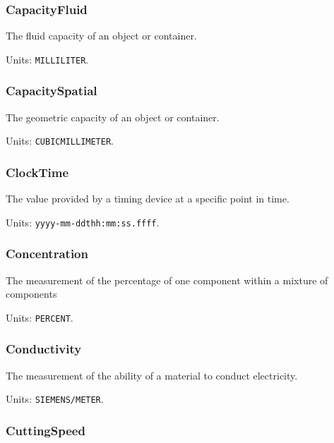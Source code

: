\subsubsection{CapacityFluid}
\label{sec:CapacityFluid}



The fluid capacity of an object or container.


Units: \texttt{MILLILITER}.

\subsubsection{CapacitySpatial}
\label{sec:CapacitySpatial}



The geometric capacity of an object or container.


Units: \texttt{CUBIC\textunderscore MILLIMETER}.

\subsubsection{ClockTime}
\label{sec:ClockTime}



The value provided by a timing device at a specific point in time.


Units: \texttt{yyyy-mm-ddthh:mm:ss.ffff}.

\subsubsection{Concentration}
\label{sec:Concentration}



The measurement of the percentage of one component within a mixture of components


Units: \texttt{PERCENT}.

\subsubsection{Conductivity}
\label{sec:Conductivity}



The measurement of the ability of a material to conduct electricity.


Units: \texttt{SIEMENS/METER}.

\subsubsection{CuttingSpeed}
\label{sec:CuttingSpeed}



